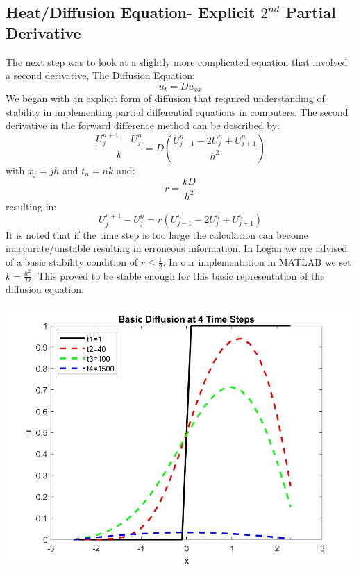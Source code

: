 \documentclass{article}
\begin{document}
\subsection{Heat/Diffusion Equation- Explicit $2^{nd}$ Partial Derivative}
The next step was to look at a slightly more complicated equation that involved a second derivative, The Diffusion Equation:
    $$u_t=Du_{xx}$$
We began with an explicit form of diffusion that required understanding of stability in implementing partial differential equations in computers.  The second derivative in the forward difference method can be described by:
    $$\frac{U_j^{n+1}-U_j^n}{k}=D\left(\frac{U^n_{j-1}-2U_j^n+U_{j+1}^n}{h^2}\right)$$
with $x_j=jh$ and $t_n=nk$ and:
    $$r=\frac{kD}{h^2}$$
resulting in:
    $$U_j^{n+1}-U_j^n=r(U^n_{j-1}-2U_j^n+U_{j+1}^n)$$
It is noted that if the time step is too large the calculation can become inaccurate/unstable resulting in erroneous information.  In Logan we are advised of a basic stability condition of $r\leq \frac{1}{2}$.  In our implementation in MATLAB we set $k=\frac{h^2}{D}$.  This proved to be stable enough for this basic representation of the diffusion equation.\\
    \begin{minipage}[t]{.49\textwidth}
    \centering
    \includegraphics[scale=0.20]{Step1_HS_Diffusion_4_timestamps.jpg}
    \label{fig:HS-Diffusion}
    \end{minipage}
    \hfill
\end{document}
